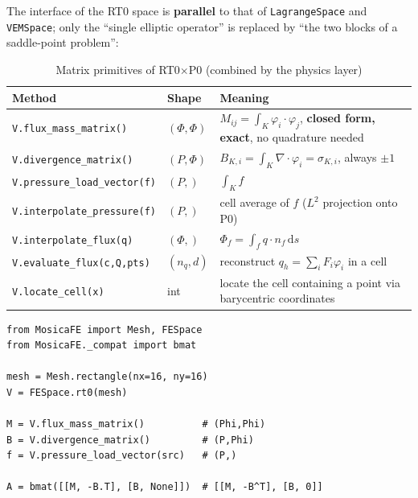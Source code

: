 \documentclass[11pt,oneside]{book}
\theoremstyle{definition}
\theoremstyle{plain}
\newcommand{\code}[1]{\texttt{#1}}
\newcommand{\dif}{\,\mathrm{d}}
\begin{document}
The interface of the RT0 space is \textbf{parallel} to that of \code{LagrangeSpace}
and \code{VEMSpace}; only the ``single elliptic operator'' is replaced by ``the two
blocks of a saddle-point problem'':

\begin{table}[htbp]
\centering
\caption{Matrix primitives of RT0$\times$P0 (combined by the physics layer)}
\label{tab:rt0-blocks}
\begin{lrbox}{\guideTableBox}
\begin{tabular}{@{}L{5.4cm}L{2.9cm}L{6.1cm}@{}}
\toprule
Method & Shape & Meaning \\
\midrule
\code{V.flux\_\allowbreak mass\_\allowbreak matrix()} & $(\Phi,\Phi)$ & $M_{ij}=\int_K\varphi_i\cdot\varphi_j$, \textbf{closed form, exact}, no quadrature needed \\
\code{V.divergence\_\allowbreak matrix()} & $(P,\Phi)$ & $B_{K,i}=\int_K\nabla\cdot\varphi_i=\sigma_{K,i}$, always $\pm1$ \\
\code{V.pressure\_\allowbreak load\_\allowbreak vector(f)} & $(P,)$ & $\int_K f$ \\
\midrule
\code{V.interpolate\_\allowbreak pressure(f)} & $(P,)$ & cell average of $f$ ($L^2$ projection onto P0) \\
\code{V.interpolate\_\allowbreak flux(q)} & $(\Phi,)$ & $\Phi_f=\int_f q\cdot n_f\dif s$ \\
\code{V.evaluate\_\allowbreak flux(c,\allowbreak Q,\allowbreak pts)} & $(n_q,d)$ & reconstruct $q_h=\sum_i F_i\varphi_i$ in a cell \\
\code{V.locate\_\allowbreak cell(x)} & int & locate the cell containing a point via barycentric coordinates \\
\bottomrule
\end{tabular}
\end{lrbox}%
\ifdim\wd\guideTableBox>\linewidth
  \resizebox{\linewidth}{!}{\usebox{\guideTableBox}}%
\else\usebox{\guideTableBox}\fi
\end{table}

\begin{lstlisting}[language=MosicaFE,caption={Using the two blocks directly}]
from MosicaFE import Mesh, FESpace
from MosicaFE._compat import bmat

mesh = Mesh.rectangle(nx=16, ny=16)
V = FESpace.rt0(mesh)

M = V.flux_mass_matrix()          # (Phi,Phi)
B = V.divergence_matrix()         # (P,Phi)
f = V.pressure_load_vector(src)   # (P,)

A = bmat([[M, -B.T], [B, None]])  # [[M, -B^T], [B, 0]]
\end{lstlisting}
\end{document}
